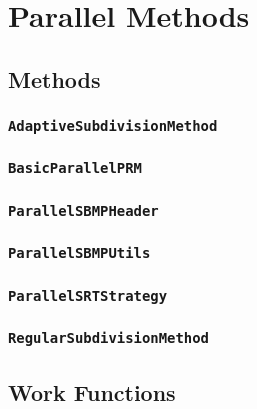 \chapter{Parallel Methods}

\section{Methods}

\subsection{\texttt{AdaptiveSubdivisionMethod}}

\subsection{\texttt{BasicParallelPRM}}

\subsection{\texttt{ParallelSBMPHeader}}

\subsection{\texttt{ParallelSBMPUtils}}

\subsection{\texttt{ParallelSRTStrategy}}

\subsection{\texttt{RegularSubdivisionMethod}}

\section{Work Functions}

